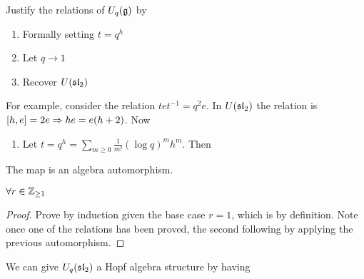 \documentclass{article}
\begin{document}
\begin{ex}
Justify the relations of $U_q(\mf{g})$ by 
\begin{enumerate}
    \item Formally setting $t = q^h$
    \item Let $q \to 1$
    \item Recover $U(\mf{sl}_2)$
\end{enumerate}
For example, consider the relation $t e t^{-1} = q^2 e$. In $U(\mf{sl}_2)$ the relation is $\comm[h]{e} = 2e \Rightarrow he =e(h+2)$. Now 
\begin{enumerate}
    \item Let $t = q^h = \sum_{m \geq 0} \frac{1}{m!} (\log q)^m h^m$. Then 
\end{enumerate}
\end{ex}

\begin{lemma}
The map 
is an algebra automorphism. 
\end{lemma}

\begin{lemma}
$\forall r \in \mbb{Z}_{\geq 1}$
\end{lemma}
\begin{proof}
Prove by induction given the base case $r=1$, which is by definition. Note once one of the relations has been proved, the second following by applying the previous automorphism. 
\end{proof}

We can give $U_q(\mf{sl}_2)$ a Hopf algebra structure by having 
\end{document}
